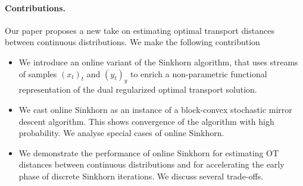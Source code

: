 \paragraph{Contributions.} Our paper proposes a new take on estimating optimal transport distances between continuous distributions. We make the following contribution
\begin{itemize}
    \item We introduce an online variant of the Sinkhorn algorithm, that uses
    streams of samples $(x_t)_t$ and $(y_t)_y$ to enrich a non-parametric
    functional representation of the dual regularized optimal transport solution.
    \item We cast online Sinkhorn as an instance of a block-convex stochastic mirror
    descent algorithm. This shows convergence of the algorithm
    with high probability. We analyse special cases of online Sinkhorn.
    \item We demonstrate the performance of online Sinkhorn for estimating OT
    distances between continuous distributions and for accelerating the early phase of discrete Sinkhorn iterations. We discuss
    several trade-offs.
\end{itemize}




